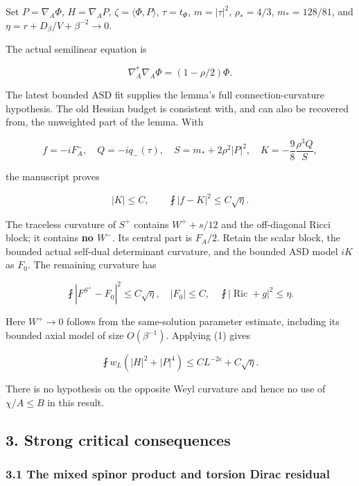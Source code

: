 \documentclass[11pt]{article}
\begin{document}
Set \(P=\nabla_A\Phi\), \(H=\nabla_AP\), \(\zeta=\langle\Phi,P\rangle\),
\(\tau=t_\Phi\), \(m=|\tau|^2\), \(\rho_*=4/3\), \(m_*=128/81\), and
\(\eta=r+D_\beta/V+\beta^{-2}\to0\).

The actual semilinear equation is

\[
 \nabla_A^*\nabla_A\Phi=(1-\rho/2)\Phi.\tag{A.9}
\]

The latest bounded ASD fit supplies the lemma's full
connection-curvature hypothesis. The old Hessian budget is consistent
with, and can also be recovered from, the unweighted part of the lemma.
With

\[
 f=-iF_A^-,\quad Q=-iq_-(\tau),\quad
 S=m_*+2\rho^2|P|^2,\quad
 K=-\frac98\frac{\rho^3Q}{S},
\]

the manuscript proves

\[
 |K|\le C,\qquad \fint|f-K|^2\le C\sqrt\eta.
\tag{A.10}
\]

The traceless curvature of \(S^+\) contains \(W^++s/12\) and the
off-diagonal Ricci block; it contains \textbf{no \(W^-\)}. Its central
part is \(F_A/2\). Retain the scalar block, the bounded actual self-dual
determinant curvature, and the bounded ASD model \(iK\) as \(F_0\). The
remaining curvature has

\[
 \fint|F^{S^+}-F_0|^2\le C\sqrt\eta,
 \quad |F_0|\le C,
 \quad \fint|\operatorname{Ric}+g|^2\le\eta.
\tag{A.11}
\]

Here \(W^+\to0\) follows from the same-solution parameter estimate,
including its bounded axial model of size \(O(\beta^{-1})\). Applying
(1) gives

\[
 \boxed{\fint w_L(|H|^2+|P|^4)
         \le C L^{-2\epsilon}+C\sqrt\eta.}\tag{A.12}
\]

There is no hypothesis on the opposite Weyl curvature and hence no use
of \(\chi/A\le B\) in this result.

\hypertarget{strong-critical-consequences}{%
\subsection{3. Strong critical
consequences}\label{strong-critical-consequences}}

\hypertarget{the-mixed-spinor-product-and-torsion-dirac-residual}{%
\subsubsection{3.1 The mixed spinor product and torsion Dirac
residual}\label{the-mixed-spinor-product-and-torsion-dirac-residual}}
\end{document}
